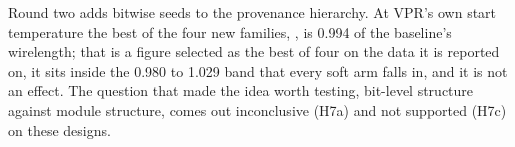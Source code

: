 Round two adds bitwise seeds to the provenance hierarchy. At VPR's own start temperature the best of the four new families, , is 0.994 of the baseline's wirelength; that is a figure selected as the best of four on the data it is reported on, it sits inside the 0.980 to 1.029 band that every soft arm falls in, and it is not an effect. The question that made the idea worth testing, bit-level structure against module structure, comes out inconclusive (H7a) and not supported (H7c) on these designs.
